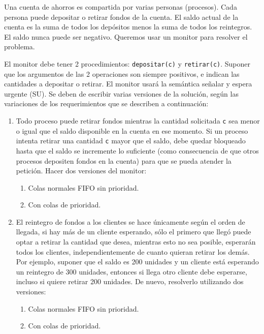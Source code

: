 \begin{ejercicio}
    Una cuenta de ahorros es compartida por varias personas (procesos). Cada persona puede depositar o retirar fondos de la cuenta. El saldo actual de la cuenta es la suma de todos los depósitos menos la suma de todos los reintegros. El saldo nunca puede ser negativo. Queremos usar un monitor para resolver el problema.

    El monitor debe tener 2 procedimientos: \verb|depositar(c)| y \verb|retirar(c)|. Suponer que los argumentos de las 2 operaciones son siempre positivos, e indican las cantidades a depositar o retirar. El monitor usará la semántica señalar y espera urgente (SU). Se deben de escribir varias versiones de la solución, según las variaciones de los requerimientos que se describen a continuación:
    \begin{enumerate}
        \item Todo proceso puede retirar fondos mientras la cantidad solicitada \verb|c| sea menor o igual que el saldo disponible en la cuenta en ese momento. Si un proceso intenta retirar una cantidad \verb|c| mayor que el saldo, debe quedar bloqueado hasta que el saldo se incremente lo suficiente (como consecuencia de que otros procesos depositen fondos en la cuenta) para que se pueda atender la petición. Hacer dos versiones del monitor:
        \begin{enumerate}
            \item Colas normales FIFO sin prioridad.
            \item Con colas de prioridad.
        \end{enumerate}
        \item El reintegro de fondos a los clientes se hace únicamente según el orden de llegada, si hay más de un cliente esperando, sólo el primero que llegó puede optar a retirar la cantidad que desea, mientras esto no sea posible, esperarán todos los clientes, independientemente de cuanto quieran retirar los demás. Por ejemplo, suponer que el saldo es 200 unidades y un cliente está esperando un reintegro de 300 unidades, entonces si llega otro cliente debe esperarse, incluso si quiere retirar 200 unidades. De nuevo, resolverlo utilizando dos versiones:
        \begin{enumerate}
            \item Colas normales FIFO sin prioridad.
            \item Con colas de prioridad.
        \end{enumerate}
    \end{enumerate}


\end{ejercicio}
